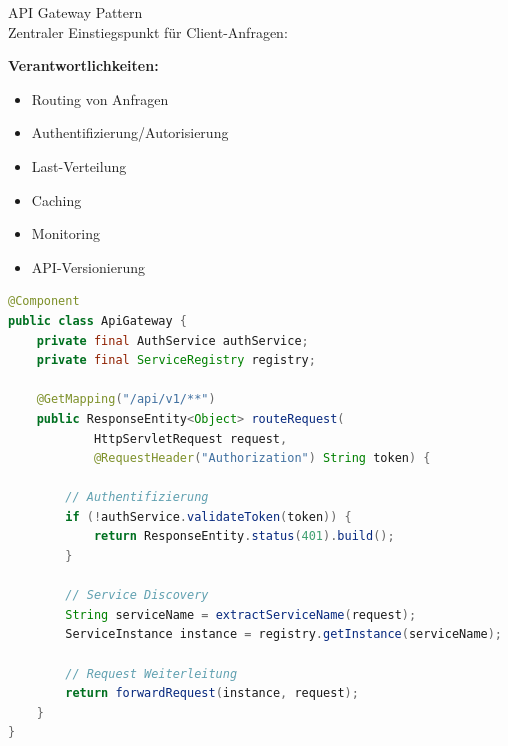 \begin{concept}{API Gateway Pattern}\\
Zentraler Einstiegspunkt für Client-Anfragen:

\textbf{Verantwortlichkeiten:}
\begin{itemize}
    \item Routing von Anfragen
    \item Authentifizierung/Autorisierung
    \item Last-Verteilung
    \item Caching
    \item Monitoring
    \item API-Versionierung
\end{itemize}

\begin{lstlisting}[language=Java, style=basesmol]
@Component
public class ApiGateway {
    private final AuthService authService;
    private final ServiceRegistry registry;
    
    @GetMapping("/api/v1/**")
    public ResponseEntity<Object> routeRequest(
            HttpServletRequest request,
            @RequestHeader("Authorization") String token) {
            
        // Authentifizierung
        if (!authService.validateToken(token)) {
            return ResponseEntity.status(401).build();
        }
        
        // Service Discovery
        String serviceName = extractServiceName(request);
        ServiceInstance instance = registry.getInstance(serviceName);
        
        // Request Weiterleitung
        return forwardRequest(instance, request);
    }
}
\end{lstlisting}
\end{concept}

